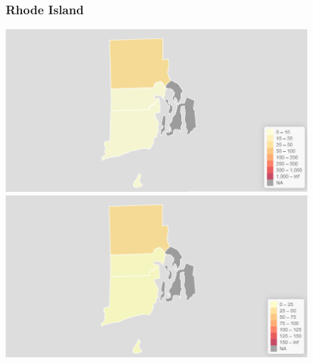 \documentclass[11pt]{article}
\begin{document}
\begin{landscape}
\thispagestyle{empty}
\begin{figure}[h]
\subsubsection*{Rhode Island}
\hspace*{-3cm}
\begin{minipage}{.8\textwidth}
    \includegraphics[width=.95\textwidth]{ImageResults/RhodeIslandTotal.PNG}
\end{minipage}%
\begin{minipage}{.8\textwidth}
    \includegraphics[width=.95\textwidth]{ImageResults/RhodeIsland100k.PNG}
\end{minipage}

\end{figure}
\end{landscape}
\end{document}
